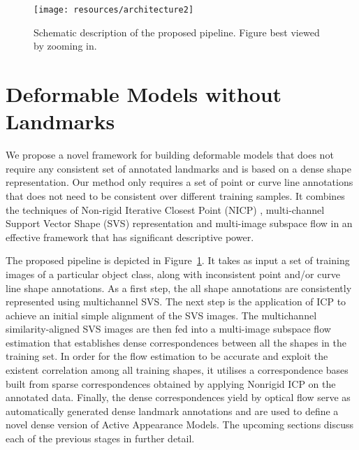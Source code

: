 \begin{figure}[t!]
    \centering
        \texttt{[image: resources/architecture2]}
    \caption{Schematic description of the proposed pipeline. Figure best viewed by zooming in.}
    \label{fig:archi}
\end{figure}

\section{Deformable Models without Landmarks}



We propose a novel framework for building deformable models that does not require any consistent set of annotated landmarks and is based on a dense shape representation. Our method only requires a set of point or curve line annotations that does not need to be consistent over different training samples. It combines the techniques of Non-rigid Iterative Closest Point (NICP) \cite{Amber2007}, multi-channel Support Vector Shape (SVS) \cite{Nguyen2013} representation and multi-image subspace flow \cite{Garg:2013hu} in an effective framework that has significant descriptive power.

The proposed pipeline is depicted in Figure~\ref{fig:archi}. It takes as input a set of training images of a particular object class, along with inconsistent point and/or curve line shape annotations.
As a first step, the all shape annotations are consistently represented using multichannel SVS.
The next step is the application of ICP to achieve an initial simple alignment of the SVS images.
The multichannel similarity-aligned SVS images are then fed into a multi-image subspace flow estimation that establishes dense correspondences between all the shapes in the training set. In order for the flow estimation to be accurate and exploit the existent correlation among all training shapes, it utilises a correspondence bases built from sparse correspondences obtained by applying Nonrigid ICP on the annotated data. Finally, the dense correspondences yield by optical flow serve as automatically generated dense landmark annotations and are used to define a novel dense version of Active Appearance Models. The upcoming sections discuss each of the previous stages in further detail.

